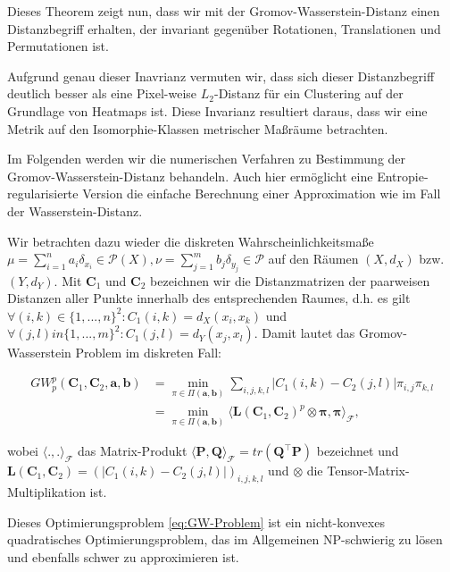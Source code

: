 \documentclass[11pt,a4paper]{article}
\numberwithin{equation}{section}
\begin{document}
	Dieses Theorem zeigt nun, dass wir mit der Gromov-Wasserstein-Distanz einen Distanzbegriff erhalten, der invariant gegenüber Rotationen, Translationen und Permutationen ist\cite{vayer2020contribution}.
	
	Aufgrund genau dieser Inavrianz vermuten wir, dass sich dieser Distanzbegriff deutlich besser als eine Pixel-weise $L_2$-Distanz für ein Clustering auf der Grundlage von Heatmaps ist. Diese Invarianz resultiert daraus, dass wir eine Metrik auf den Isomorphie-Klassen metrischer Maßräume betrachten.
	
	Im Folgenden werden wir die numerischen Verfahren zu Bestimmung der Gromov-Wasserstein-Distanz behandeln. Auch hier ermöglicht eine Entropie-regularisierte Version die einfache Berechnung einer Approximation wie im Fall der Wasserstein-Distanz.
	
	Wir betrachten dazu wieder die diskreten Wahrscheinlichkeitsmaße $\mu = \sum_{i=1}^n{a_i\delta_{x_i}} \in \mathcal{P}(X), \nu = \sum_{j=1}^m{b_j\delta_{y_j}} \in \mathcal{P}$ auf den Räumen $(X,d_X)$ bzw. $(Y,d_Y)$. Mit $\boldsymbol{C}_1$ und $\boldsymbol{C}_2$ bezeichnen wir die Distanzmatrizen der paarweisen Distanzen aller Punkte innerhalb des entsprechenden Raumes, d.h. es gilt $\forall (i,k) \in \lbrace 1,...,n \rbrace^2 : C_1(i,k) = d_X(x_i,x_k)$ und	$\forall (j,l) in \lbrace 1,...,m \rbrace^2 : C_1(j,l) = d_Y(x_j,x_l)$. Damit lautet das Gromov-Wasserstein Problem im diskreten Fall:
	
	\begin{align}
		GW_p^p(\boldsymbol{C}_1, \boldsymbol{C}_2,\boldsymbol{a},\boldsymbol{b}) &= \min_{\pi \in \Pi(\boldsymbol{a}, \boldsymbol{b})}\sum_{i,j,k,l}{|C_1(i,k)- C_2(j,l)|\pi_{i,j}\pi_{k,l}}\\
		&=\min_{\pi \in \Pi(\boldsymbol{a}, \boldsymbol{b})} \langle \boldsymbol{L}(\boldsymbol{C}_1, \boldsymbol{C}_2)^p \otimes \boldsymbol{\pi}, \boldsymbol{\pi}\rangle_\mathcal{F},\label{eq:GW-Problem}
	\end{align}
	
	wobei $\langle .,.\rangle_\mathcal{F}$ das Matrix-Produkt $\langle \boldsymbol{P}, \boldsymbol{Q} \rangle_\mathcal{F}  = tr(\boldsymbol{Q}^\top\boldsymbol{P})$ bezeichnet und $\boldsymbol{L}(\boldsymbol{C}_1, \boldsymbol{C}_2) = (|C_1(i,k)-C_2(j,l)|)_{i,j,k,l}$ und $\otimes$ die Tensor-Matrix-Multiplikation ist.
	
	Dieses Optimierungsproblem \autoref{eq:GW-Problem} ist ein nicht-konvexes quadratisches Optimierungsproblem, das im Allgemeinen NP-schwierig zu lösen und ebenfalls schwer zu approximieren ist.
	
\end{document}
